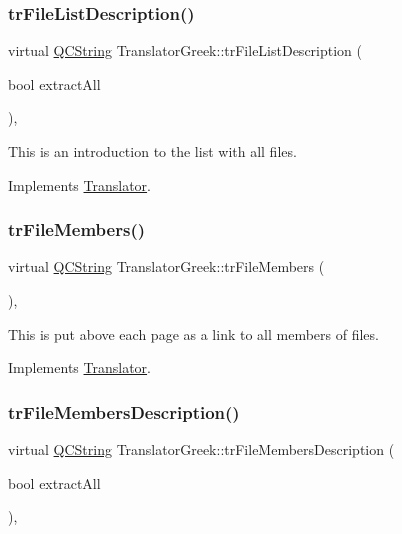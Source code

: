 \subsubsection{\texorpdfstring{trFileListDescription()}{trFileListDescription()}}
{\footnotesize\ttfamily virtual \mbox{\hyperlink{class_q_c_string}{Q\+C\+String}} Translator\+Greek\+::tr\+File\+List\+Description (\begin{DoxyParamCaption}\item[{bool}]{extract\+All }\end{DoxyParamCaption})\hspace{0.3cm}{\ttfamily [inline]}, {\ttfamily [virtual]}}

This is an introduction to the list with all files. 

Implements \mbox{\hyperlink{class_translator}{Translator}}.

\mbox{\label{class_translator_greek_a88d4ef183d59d532a1ce0ce3bc96b04d}} 
\subsubsection{\texorpdfstring{trFileMembers()}{trFileMembers()}}
{\footnotesize\ttfamily virtual \mbox{\hyperlink{class_q_c_string}{Q\+C\+String}} Translator\+Greek\+::tr\+File\+Members (\begin{DoxyParamCaption}{ }\end{DoxyParamCaption})\hspace{0.3cm}{\ttfamily [inline]}, {\ttfamily [virtual]}}

This is put above each page as a link to all members of files. 

Implements \mbox{\hyperlink{class_translator}{Translator}}.

\mbox{\label{class_translator_greek_aab12edf2228a59e9c419d18b66a35841}} 
\subsubsection{\texorpdfstring{trFileMembersDescription()}{trFileMembersDescription()}}
{\footnotesize\ttfamily virtual \mbox{\hyperlink{class_q_c_string}{Q\+C\+String}} Translator\+Greek\+::tr\+File\+Members\+Description (\begin{DoxyParamCaption}\item[{bool}]{extract\+All }\end{DoxyParamCaption})\hspace{0.3cm}{\ttfamily [inline]}, {\ttfamily [virtual]}}

